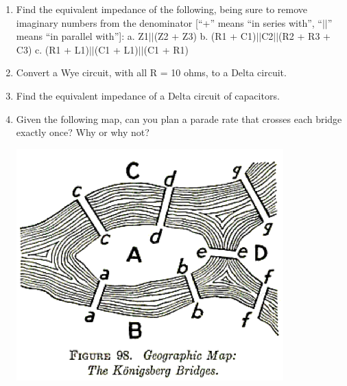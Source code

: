 \documentclass[11pt]{book}
\begin{document}
\begin{enumerate}
	\item Find the equivalent impedance of the following, being sure to remove imaginary numbers from the denominator [``+'' means ``in series with'', ``$\vert\vert$'' means ``in parallel with'']:
	\subitem a.	Z1$\vert\vert$(Z2 + Z3)
	\subitem b.	(R1 + C1)$\vert\vert$C2$\vert\vert$(R2 + R3 + C3)
	\subitem c.	(R1 + L1)$\vert\vert$(C1 + L1)$\vert\vert$(C1 + R1)
	\item Convert a Wye circuit, with all R = 10 ohms, to a Delta circuit.
	\item Find the equivalent impedance of a Delta circuit of capacitors.	
	\item Given the following map, can you plan a parade rate that crosses each bridge exactly once? Why or why not?
	
	\begin{center}\includegraphics{figures/q1.02.png}\end{center} 
	

\end{enumerate}
\end{document}
